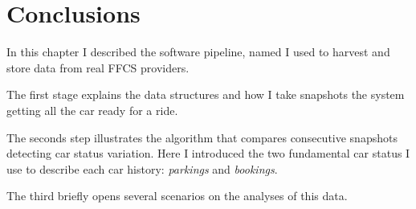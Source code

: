 \section{Conclusions}
\label{sec:2_6_conclusions}
In this chapter I described the software pipeline, named \tool I used to harvest and store data from real FFCS providers. 

The first stage explains the data structures and how I take snapshots the system getting all the car ready for a ride. 

The seconds step illustrates the algorithm that compares consecutive snapshots detecting car status variation. Here I introduced the two fundamental car status I use to describe each car history: \textit{parkings} and \textit{bookings}. 

The third briefly opens several scenarios on the analyses of this data.


